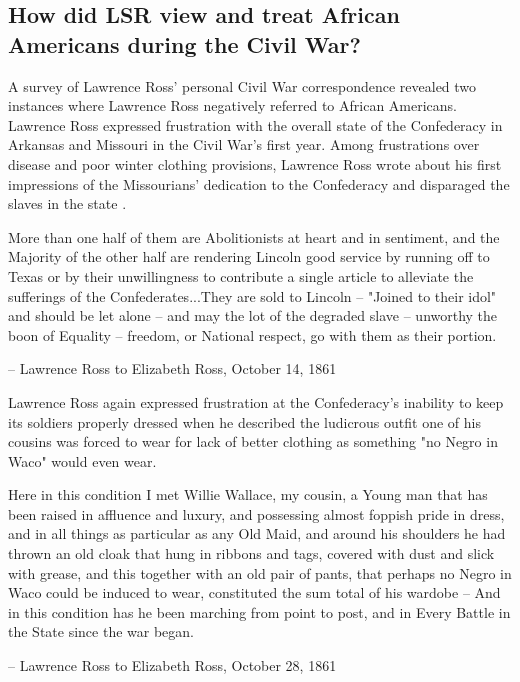 \documentclass[12pt]{article}
\begin{document}
\newpage
\subsection{How did LSR view and treat African Americans during the Civil War?}
A survey of Lawrence Ross' personal Civil War correspondence revealed two instances where Lawrence Ross negatively referred to African Americans. Lawrence Ross expressed frustration with the overall state of the Confederacy in Arkansas and Missouri in the Civil War's first year. Among frustrations over disease and poor winter clothing provisions, Lawrence Ross wrote about his first impressions of the Missourians' dedication to the Confederacy and disparaged the slaves in the state \cite[pg. 13-14]{sullyletters}.
\begin{displayquote}
More than one half of them are Abolitionists at heart and in sentiment, and the Majority of the other half are rendering Lincoln good service by running off to Texas or by their unwillingness to contribute a single article to alleviate the sufferings of the Confederates...They are sold to Lincoln -- "Joined to their idol" and should be let alone -- and may the lot of the degraded slave -- unworthy the boon of Equality -- freedom, or National respect, go with them as their portion.

-- Lawrence Ross to Elizabeth Ross, October 14, 1861 \cite[pg. 14]{sullyletters} 

\end{displayquote} 

Lawrence Ross again expressed frustration at the Confederacy's inability to keep its soldiers properly dressed when he described the ludicrous outfit one of his cousins was forced to wear for lack of better clothing as something "no Negro in Waco" would even wear.
\begin{displayquote}
Here in this condition I met Willie Wallace, my cousin, a Young man that has been raised in affluence and luxury, and possessing almost foppish pride in dress, and in all things as particular as any Old Maid, and around his shoulders he had thrown an old cloak that hung in ribbons and tags, covered with dust and slick with grease, and this together with an old pair of pants, that perhaps no Negro in Waco could be induced to wear, constituted the sum total of his wardobe -- And in this condition has he been marching from point to post, and in Every Battle in the State since the war began.

-- Lawrence Ross to Elizabeth Ross, October 28, 1861 \cite[pg. 16]{sullyletters}
\end{displayquote}
\end{document}
